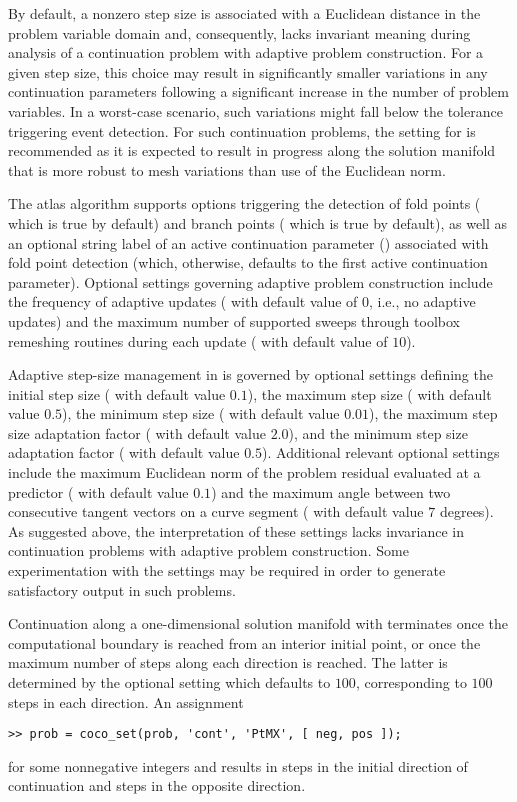 By default, a nonzero step size is associated with a Euclidean distance in the problem variable domain and, consequently, lacks invariant meaning during analysis of a continuation problem with adaptive problem construction. For a given step size, this choice may result in significantly smaller variations in any continuation parameters following a significant increase in the number of problem variables. In a worst-case scenario, such variations might fall below the tolerance triggering event detection. For such continuation problems, the setting  for  is recommended as it is expected to result in progress along the solution manifold that is more robust to mesh variations than use of the Euclidean norm. 

The  atlas algorithm supports options triggering the detection of fold points ( which is true by default) and branch points ( which is true by default), as well as an optional string label of an active continuation parameter () associated with fold point detection (which, otherwise, defaults to the first active continuation parameter). Optional settings governing adaptive problem construction include the frequency of adaptive updates ( with default value of $0$, i.e., no adaptive updates) and the maximum number of supported sweeps through toolbox remeshing routines during each update ( with default value of $10$).

Adaptive step-size management in  is governed by optional settings defining the initial step size ( with default value $0.1$), the maximum step size ( with default value $0.5$), the minimum step size ( with default value $0.01$), the maximum step size adaptation factor ( with default value $2.0$), and the minimum step size adaptation factor ( with default value $0.5$). Additional relevant optional settings include the maximum Euclidean norm of the problem residual evaluated at a predictor ( with default value $0.1$) and the maximum angle between two consecutive tangent vectors on a curve segment ( with default value $7$ degrees). As suggested above, the interpretation of these settings lacks invariance in continuation problems with adaptive problem construction. Some experimentation with the settings may be required in order to generate satisfactory output in such problems.

Continuation along a one-dimensional solution manifold with  terminates once the computational boundary is reached from an interior initial point, or once the maximum number of steps along each direction is reached. The latter is determined by the optional setting  which defaults to $100$, corresponding to $100$ steps in each direction. An assignment
\begin{lstlisting}[language=coco-highlight]
>> prob = coco_set(prob, 'cont', 'PtMX', [ neg, pos ]);
\end{lstlisting}
for some nonnegative integers  and  results in  steps in the initial direction of continuation and  steps in the opposite direction.

